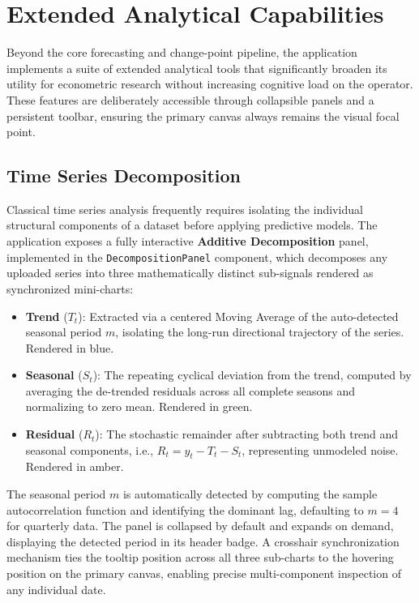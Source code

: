 \section{Extended Analytical Capabilities}
Beyond the core forecasting and change-point pipeline, the application implements a suite of extended analytical tools that significantly broaden its utility for econometric research without increasing cognitive load on the operator. These features are deliberately accessible through collapsible panels and a persistent toolbar, ensuring the primary canvas always remains the visual focal point.

\subsection{Time Series Decomposition}
Classical time series analysis frequently requires isolating the individual structural components of a dataset before applying predictive models. The application exposes a fully interactive \textbf{Additive Decomposition} panel, implemented in the \texttt{DecompositionPanel} component, which decomposes any uploaded series into three mathematically distinct sub-signals rendered as synchronized mini-charts:

\begin{itemize}
    \item \textbf{Trend} ($T_t$): Extracted via a centered Moving Average of the auto-detected seasonal period $m$, isolating the long-run directional trajectory of the series. Rendered in blue.
    \item \textbf{Seasonal} ($S_t$): The repeating cyclical deviation from the trend, computed by averaging the de-trended residuals across all complete seasons and normalizing to zero mean. Rendered in green.
    \item \textbf{Residual} ($R_t$): The stochastic remainder after subtracting both trend and seasonal components, i.e., $R_t = y_t - T_t - S_t$, representing unmodeled noise. Rendered in amber.
\end{itemize}

The seasonal period $m$ is automatically detected by computing the sample autocorrelation function and identifying the dominant lag, defaulting to $m=4$ for quarterly data. The panel is collapsed by default and expands on demand, displaying the detected period in its header badge. A crosshair synchronization mechanism ties the tooltip position across all three sub-charts to the hovering position on the primary canvas, enabling precise multi-component inspection of any individual date.


